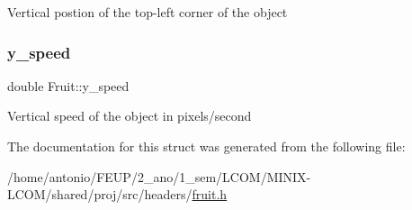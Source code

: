 Vertical postion of the top-\/left corner of the object \mbox{\label{structFruit_a8e2b3a76e886f184b4845a2629f925b8}} 
\subsubsection{\texorpdfstring{y\+\_\+speed}{y\_speed}}
{\footnotesize\ttfamily double Fruit\+::y\+\_\+speed}

Vertical speed of the object in pixels/second 

The documentation for this struct was generated from the following file\+:\begin{DoxyCompactItemize}
\item 
/home/antonio/\+F\+E\+U\+P/2\+\_\+ano/1\+\_\+sem/\+L\+C\+O\+M/\+M\+I\+N\+I\+X-\/\+L\+C\+O\+M/shared/proj/src/headers/\hyperlink{fruit_8h}{fruit.\+h}\end{DoxyCompactItemize}
